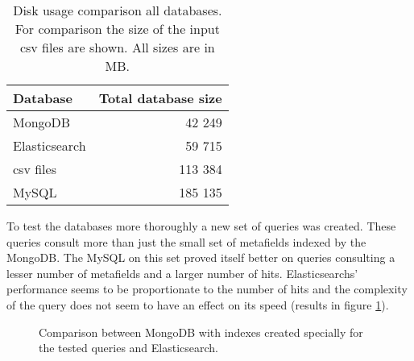 \begin{table}[h]
\centering
\begin{tabular}{|l|r|}
\hline
Database      & \multicolumn{1}{l|}{Total database size} \\ \hline
MongoDB       & 42 249                                   \\ \hline
Elasticsearch & 59 715                                   \\ \hline
csv files     & 113 384                                  \\ \hline
MySQL         & 185 135                                  \\ \hline
\end{tabular}
\caption{Disk usage comparison all databases. For comparison the size of the input csv files are shown. All sizes 
are in MB.}
\label{tab:allDbSizes}
\end{table}

To test the databases more thoroughly a new set of queries was created. These queries consult more than just the 
small set of metafields indexed by the MongoDB. The MySQL on this set proved itself better on queries consulting
a lesser number of metafields and a larger number of hits. Elasticsearchs' performance seems to be proportionate
to the number of hits and the complexity of the query does not seem to have an effect on its speed (results in 
figure \ref{fig:wide}).

\begin{figure}[h]
	\centering
	
	\caption{Comparison between MongoDB with indexes created specially for the tested queries and Elasticsearch.}
	\label{fig:wide}
\end{figure}

